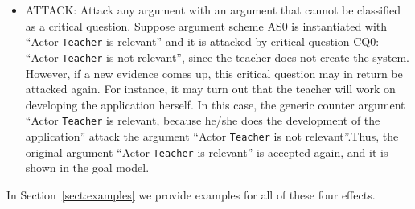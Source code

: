 \begin{itemize}
\item \textsf{ATTACK:} Attack any argument with an argument that cannot be classified as a critical question. Suppose argument scheme AS0 is instantiated with ``Actor \texttt{Teacher} is relevant'' and it is attacked by critical question CQ0: ``Actor \texttt{Teacher} is not relevant'', since the teacher does not create the system. However,  if a new evidence comes up, this critical question may in return be attacked again. For instance, it may turn out that the teacher will work on developing the application herself.  In this case, the generic counter argument ``Actor \texttt{Teacher} is relevant, because he/she does the development of the application'' attack the argument ``Actor \texttt{Teacher} is not relevant''.Thus, the original argument ``Actor \texttt{Teacher} is relevant'' is accepted again, and it is shown in the goal model.
\end{itemize}

In Section~\ref{sect:examples} we provide examples for all of these four effects.




